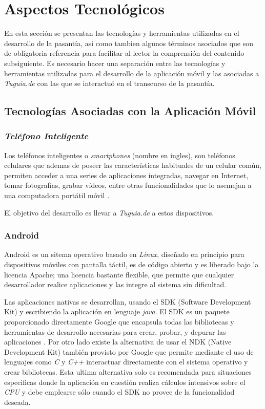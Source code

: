 \section{Aspectos Tecnológicos} \label{sect:aspectos_tecnologicos}

En esta sección se presentan las tecnologías y herramientas utilizadas en el desarrollo de la pasantía, asi como tambien algunos términos asociados que son de obligatoria referencia para facilitar al lector la comprensión del contenido subsiguiente. Es necesario hacer una separación entre las tecnologías y herramientas utilizadas para el desarrollo de la aplicación móvil y las asociadas a \textit{Tuguia.de} con las que se interactuó en el transcurso de la pasantía.

\subsection{Tecnologías Asociadas con la Aplicación Móvil} \label{subsect:Asociadas_movil}

\subsubsection{\textit{Teléfono Inteligente}}

Los teléfonos inteligentes o \textit{smartphones} (nombre en ingles), son teléfonos celulares que ademas de poseer las características habituales de un celular común, permiten acceder a una series de aplicaciones integradas, navegar en Internet, tomar fotografías, grabar vídeos, entre otras funcionalidades que lo asemejan  a una computadora portátil móvil \cite{PCM}.

El objetivo del desarrollo es llevar a \textit{Tuguia.de} a estos dispositivos.

\subsubsection{Android}

Android es un sitema operativo basado en \textit{Linux}, diseñado en principio para dispositivos móviles con pantalla táctil, es de código abierto y es liberado bajo la licencia Apache; una licencia bastante flexible, que permite que cualquier desarrollador realice aplicaciones y las integre al sistema sin dificultad.

Las aplicaciones nativas se desarrollan, usando el SDK (Software Development Kit) y escribiendo la aplicación en lenguaje \textit{java}. El SDK es un paquete proporcionado directamente Google que encapsula todas las bibliotecas y herramientas de desarrollo necesarias para crear, probar, y depurar las aplicaciones \cite{ASDK}. Por otro lado existe la alternativa de usar el NDK (Native Development Kit) también provisto por Google que permite mediante el uso de lenguajes como \textit{C} y \textit{C++} interactuar directamente con el sistema operativo y crear bibliotecas. Esta ultima alternativa solo es recomendada para situaciones especificas donde la aplicación en cuestión realiza cálculos intensivos sobre el \textit{CPU} y debe emplearse sólo cuando el SDK no provee de la funcionalidad deseada\cite{ANDK}.

